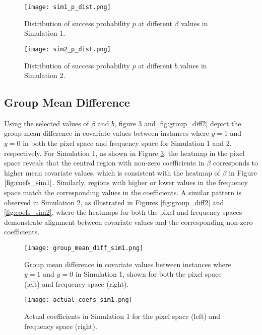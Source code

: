 \documentclass[12pt]{article}
\begin{document}
\begin{figure}[h!]
	\centering
	\texttt{[image: sim1\_p\_dist.png]}
	\caption{Distribution of success probability \( p \) at different \( \beta \) values in Simulation 1.}
	\label{fig:sim1_p_dist}
\end{figure}

\begin{figure}[h!]
	\centering
	\texttt{[image: sim2\_p\_dist.png]}
	\caption{Distribution of success probability \( p \) at different \( b \) values in Simulation 2.}
	\label{fig:sim2_p_dist}
\end{figure}

\FloatBarrier

\subsection*{Group Mean Difference}

Using the selected values of \( \beta \) and \( b \), figure \ref{fig:group_diff1} and \ref{fig:group_diff2} depict the group mean difference in covariate values between instances where \( y = 1 \) and \( y = 0 \) in both the pixel space and frequency space for Simulation 1 and 2, respectively. For Simulation 1, as shown in Figure \ref{fig:group_diff1}, the heatmap in the pixel space reveals that the central region with non-zero coefficients in \( \beta \) corresponds to higher mean covariate values, which is consistent with the heatmap of \( \beta \) in Figure \( \ref{fig:coefs_sim1} \). Similarly, regions with higher or lower values in the frequency space match the corresponding values in the coefficients. A similar pattern is observed in Simulation 2, as illustrated in Figures \ref{fig:group_diff2} and \ref{fig:coefs_sim2}, where the heatmaps for both the pixel and frequency spaces demonstrate alignment between covariate values and the corresponding non-zero coefficients.

\begin{figure}[h!]
	\centering
	\texttt{[image: group\_mean\_diff\_sim1.png]}
	\caption{Group mean difference in covariate values between instances where \( y = 1 \) and \( y = 0 \) in Simulation
		1, shown for both the pixel space (left) and frequency space (right).}
	\label{fig:group_diff1}
\end{figure}

\begin{figure}[h!]
	\centering
	\texttt{[image: actual\_coefs\_sim1.png]}
	\caption{Actual coefficients in Simulation 1 for the pixel space (left) and frequency space (right).}
	\label{fig:coefs_sim1}
\end{figure}
\end{document}
